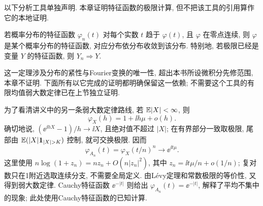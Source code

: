 以下分析工具单独声明. 本章证明特征函数的极限计算, 但不把该工具的引用算作它的本地证明.
\begin{theorem}
若概率分布的特征函数 $\varphi_n(t)$ 对每个实数 $t$ 趋于 $\varphi(t)$, 且 $\varphi$ 在零点连续, 则 $\varphi$ 是某个概率分布的特征函数, 对应分布依分布收敛到该分布. 特别地, 若极限已经是变量 $Y$ 的特征函数, 则 $Y_n\Rightarrow Y$.
\end{theorem}
这一定理涉及分布的紧性与Fourier变换的唯一性, 超出本书所设微积分先修范围, 本章不证明. 下面所有以它完成的证明都明确保留这一依赖; 不需要这个工具的有限均值弱大数定律已在上节独立证明.

为了看清讲义中的另一条弱大数定律路线, 若 $\mathbb E|X|<\infty$, 则
\[\varphi_X(h)=1+\ii h\mu+o(h).\]
确切地说, $(\ee^{\ii hX}-1)/h\to\ii X$, 且绝对值不超过 $|X|$; 在有界部分一致取极限, 尾部由 $\E(|X|\ind_{|X|>K})$ 控制, 就可交换极限. 因而
\[\varphi_{A_n}(t)=\varphi_X(t/n)^n\longrightarrow\ee^{\ii t\mu}.\]
这里使用 $n\log(1+z_n)=nz_n+O(n|z_n|^2)$, 其中 $z_n=\ii t\mu/n+o(1/n)$; 复对数只在1附近选取连续分支, 不需要全局定义. 由L\'evy定理和常数极限的等价性, 又得到弱大数定律. Cauchy特征函数 $\ee^{-|t|}$ 则给出 $\varphi_{A_n}(t)=\ee^{-|t|}$, 解释了平均不集中的现象; 此处使用Cauchy特征函数的已知计算.

